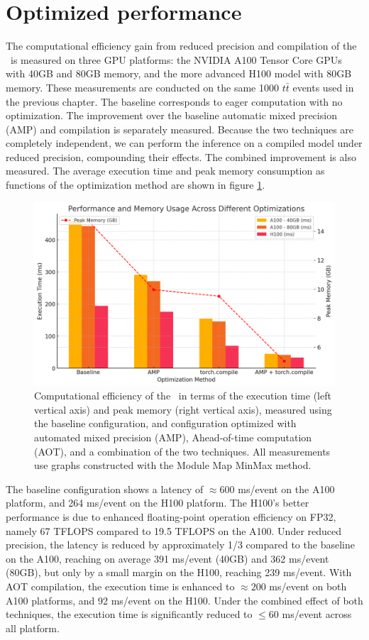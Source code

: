 \section{Optimized performance}
\label{sect:comp-performance}
The computational efficiency gain from reduced precision and compilation of the \ignn~is measured on three GPU platforms: the NVIDIA A100 Tensor Core GPUs with 40GB and 80GB memory, and the more advanced H100 model with 80GB memory.
These measurements are conducted on the same 1000 $t\bar{t}$ events used in the previous chapter.
The baseline corresponds to eager computation with no optimization. 
The improvement over the baseline automatic mixed precision (AMP) and compilation is separately measured.
Because the two techniques are completely independent, we can perform the inference on a compiled model under reduced precision, compounding their effects.
The combined improvement is also measured.
The average execution time and peak memory consumption as functions of the optimization method are shown in figure \ref{fig:gnn-opt}. 

\begin{figure}[h!]
    \centering
    \includegraphics[width=0.8\linewidth]{figures/compute-opt.png}
    \caption{Computational efficiency of the \ignn~in terms of the execution time (left vertical axis) and peak memory (right vertical axis), measured using the baseline configuration, and configuration optimized with automated mixed precision (AMP), Ahead-of-time computation (AOT), and a combination of the two techniques. All measurements use graphs constructed with the Module Map MinMax method.}
    \label{fig:gnn-opt}
\end{figure}

The baseline configuration shows a latency of $\approx600$ ms/event on the A100 platform, and 264 ms/event on the H100 platform.
The H100's better performance is due to enhanced floating-point operation efficiency on FP32, namely 67 TFLOPS compared to 19.5 TFLOPS on the A100.
Under reduced precision, the latency is reduced by approximately 1/3 compared to the baseline on the A100, reaching on average 391 ms/event (40GB) and 362 ms/event (80GB), but only by a small margin on the H100, reaching 239 ms/event.
With AOT compilation, the execution time is enhanced to $\approx 200$ ms/event on both A100 platforms, and 92 ms/event on the H100.
Under the combined effect of both techniques, the execution time is significantly reduced to $\le 60$ ms/event across all platform. 

